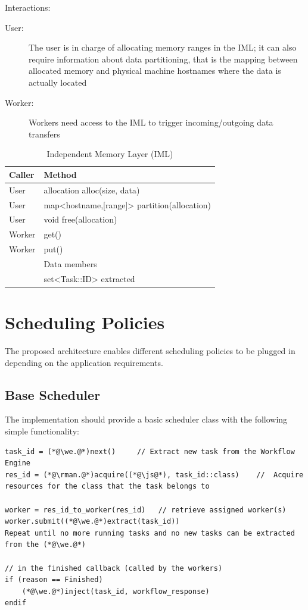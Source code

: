 \documentclass[10pt]{article}
\newcommand{\user}{User\xspace}
\newcommand{\worker}{Worker\xspace}
\newcommand{\rman}{RM\xspace}
\newcommand{\iml}{IML\xspace}
\newcommand{\we}{WE\xspace}
\newcommand{\task}{Task\xspace}
\newcommand{\id}{::ID\xspace}
\begin{document}
Interactions:
\begin{description}
    \item [\user:] The user is in charge of allocating memory ranges in the
    \iml; it can also require information about data partitioning, that is the
    mapping between allocated memory and physical machine hostnames where the 
    data is actually located
    \item [\worker:] Workers need access to the \iml to trigger
    incoming/outgoing data transfers
\end{description}
%
\begin{table}[ht]
    \centering
    \caption{Independent Memory Layer (IML)}
    \label{tab:iml}
    \bgroup
    \setlength{\tabcolsep}{2em}
    \begin{tabular}{ll}
        \toprule
        Caller & Method \\
        \midrule
        \user & allocation alloc(size, data) \\
        \user & map<hostname,[range]> partition(allocation) \\
        \user & void free(allocation)  \\
        \worker & get() \\
        \worker & put() \\
        \midrule
        & Data members \\
        \midrule
        & set<\task\id> extracted \\
        \bottomrule
    \end{tabular}
    \egroup
\end{table}
%



\section{Scheduling Policies}

The proposed architecture enables different scheduling policies to be plugged 
in depending on the application requirements.

\subsection{Base Scheduler}
The implementation should provide a basic scheduler class with the following
simple functionality:
\begin{lstlisting}
task_id = (*@\we.@*)next()     // Extract new task from the Workflow Engine
res_id = (*@\rman.@*)acquire((*@\js@*), task_id::class)    //  Acquire resources for the class that the task belongs to

worker = res_id_to_worker(res_id)   // retrieve assigned worker(s)
worker.submit((*@\we.@*)extract(task_id))
Repeat until no more running tasks and no new tasks can be extracted from the (*@\we.@*)

// in the finished callback (called by the workers)
if (reason == Finished)
    (*@\we.@*)inject(task_id, workflow_response)
endif
\end{lstlisting}
\end{document}
